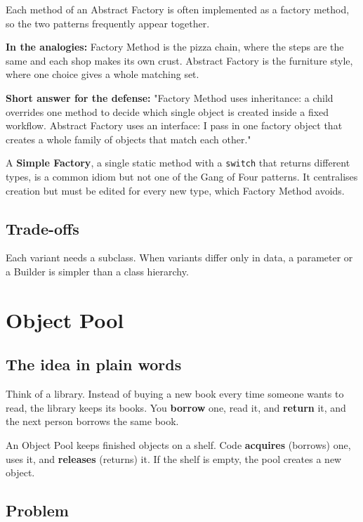 \documentclass{utmreport}
\providecommand{\passthrough}[1]{#1}
\begin{document}
Each method of an Abstract Factory is often implemented as a factory method, so the two patterns frequently appear together.

\textbf{In the analogies:} Factory Method is the pizza chain, where the steps are the same and each shop makes its own crust. Abstract Factory is the furniture style, where one choice gives a whole matching set.

\textbf{Short answer for the defense:} "Factory Method uses inheritance: a child overrides one method to decide which single object is created inside a fixed workflow. Abstract Factory uses an interface: I pass in one factory object that creates a whole family of objects that match each other."

A \textbf{Simple Factory}, a single static method with a \passthrough{\lstinline!switch!} that returns different types, is a common idiom but not one of the Gang of Four patterns. It centralises creation but must be edited for every new type, which Factory Method avoids.

\section{Trade-offs}

Each variant needs a subclass. When variants differ only in data, a parameter or a Builder is simpler than a class hierarchy.

\chapter{Object Pool}

\section{The idea in plain words}

Think of a library. Instead of buying a new book every time someone wants to read, the library keeps its books. You \textbf{borrow} one, read it, and \textbf{return} it, and the next person borrows the same book.

An Object Pool keeps finished objects on a shelf. Code \textbf{acquires} (borrows) one, uses it, and \textbf{releases} (returns) it. If the shelf is empty, the pool creates a new object.

\section{Problem}
\end{document}

